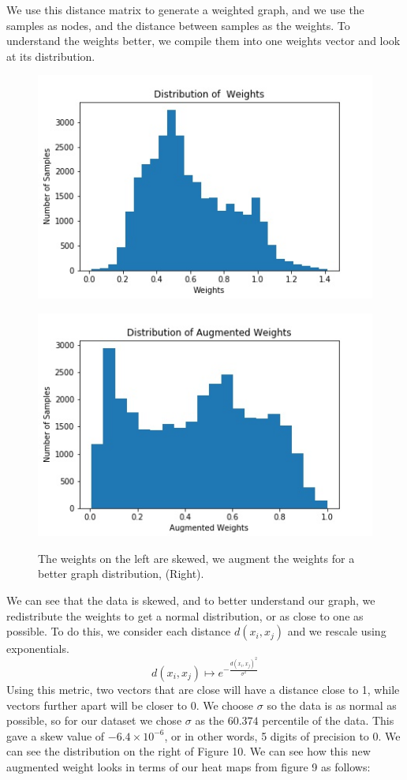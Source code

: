 \documentclass{article}
\theoremstyle{definition} \newtheorem*{lte}{Definition}
\theoremstyle{plain} \newtheorem*{csbt}{Theorem}
\begin{document}
We use this distance matrix to generate a weighted graph, and we use the samples as nodes, and the distance between samples as the weights. To understand the weights better, we compile them into one weights vector and look at its distribution. 

\begin{figure}[H]
\begin{center}
\begin{subfloat}{
\includegraphics[width = .4\linewidth]{Weights.jpg}}
\end{subfloat}
\begin{subfloat}{
\includegraphics[width = .4\linewidth]{AugWeights.jpg}
}\end{subfloat}
\caption{The weights on the left are skewed, we augment the weights for a better graph distribution, (Right). }
\end{center}
\end{figure}

We can see that the data is skewed, and to better understand our graph, we redistribute the weights to get a normal distribution, or as close to one as possible. To do this, we consider each distance $d(x_i, x_j)$ and we rescale using exponentials. 
$$d(x_i, x_j) \mapsto e^{-\frac{d(x_i, x_j)^2}{\sigma^2}}$$
Using this metric, two vectors that are close will have a distance close to 1, while vectors further apart will be closer to 0. We choose $\sigma$ so the data is as normal as possible, so for our dataset we chose $\sigma$ as the $60.374$ percentile of the data. This gave a skew value of $-6.4\times 10^{-6}$, or in other words, 5 digits of precision to 0. We can see the distribution on the right of Figure 10. We can see how this new augmented weight looks in terms of our heat maps from figure 9 as follows: 
\end{document}
